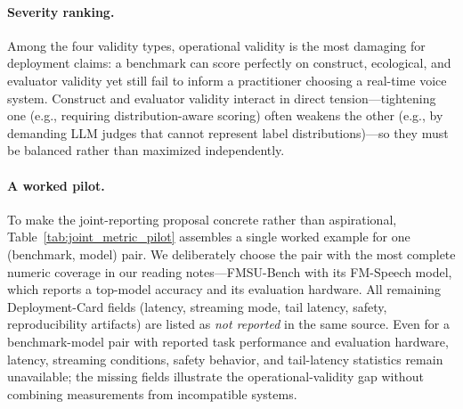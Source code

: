 \paragraph{Severity ranking.}
Among the four validity types, operational validity is the most damaging
for deployment claims: a benchmark can score perfectly on
construct, ecological, and evaluator validity yet still fail to inform a
practitioner choosing a real-time voice system. Construct and evaluator
validity interact in direct tension---tightening one (e.g., requiring
distribution-aware scoring) often weakens the other (e.g., by demanding
LLM judges that cannot represent label distributions)---so they must be
balanced rather than maximized independently.

\paragraph{A worked pilot.}
To make the joint-reporting proposal concrete rather than aspirational,
Table~\ref{tab:joint_metric_pilot} assembles a single worked example
for one (benchmark, model) pair. We deliberately choose the pair with
the most complete numeric coverage in our reading notes---FMSU-Bench
with its FM-Speech model, which reports a top-model accuracy and its
evaluation hardware. All remaining Deployment-Card fields (latency,
streaming mode, tail latency, safety, reproducibility artifacts) are
listed as \emph{not reported} in the same source. Even for a
benchmark-model pair with reported task performance and evaluation
hardware, latency, streaming conditions, safety behavior, and
tail-latency statistics remain unavailable; the missing fields
illustrate the operational-validity gap without combining measurements
from incompatible systems.

